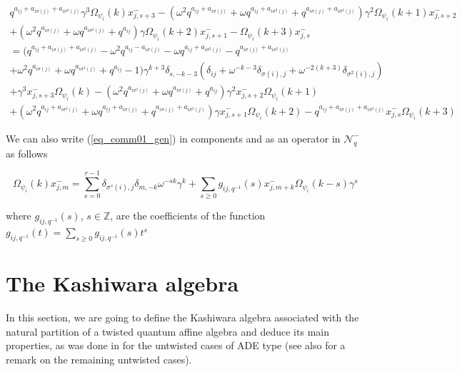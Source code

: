 \documentclass[12pt]{amsart}
\numberwithin{equation}{section}
\newcommand{\Z}{\ensuremath{\mathbb{Z}}}
\newcommand{\mc}[1]{\mathcal{#1}}
\begin{document}
\begin{multline}\label{Kas_commxO_r3}
    q^{a_{ij} + a_{i\sigma(j)} + a_{i\sigma^2(j)}}\gamma^3\Omega_{\psi_i}(k)x_{j,s+3}^- - (\omega^2q^{a_{ij} + a_{i\sigma(j)}} + \omega q^{a_{ij} + a_{i\sigma^2(j)}} + q^{a_{i\sigma(j)} + a_{i\sigma^2(j)}})\gamma^2\Omega_{\psi_i}(k+1)x_{j,s+2}^-\\
   + (\omega^2q^{a_{i\sigma(j)}} + \omega q^{a_{i\sigma^2(j)}} + q^{a_{ij}})\gamma\Omega_{\psi_i}(k+2)x_{j,s+1}^- - \Omega_{\psi_i}(k+3)x_{j,s}^-\\
   = \bigl(q^{a_{ij} + a_{i\sigma(j)} + a_{i\sigma^2(j)}} - \omega^2q^{a_{ij} - a_{i\sigma(j)}} - \omega q^{a_{ij} + a_{i\sigma^2(j)}} - q^{a_{i\sigma(j)} + a_{i\sigma^2(j)}}\\
   + \omega^2q^{a_{i\sigma(j)}} + \omega q^{a_{i\sigma^2(j)}} + q^{a_{ij}} - 1 \bigl)\gamma^{k+3}\delta_{s,-k-3}(\delta_{ij} + \omega^{-k-3}\delta_{\sigma(i),j} + \omega^{-2(k+3)}\delta_{\sigma^2(i),j})\\
   + \gamma^3 x_{j,s+3}^-\Omega_{\psi_i}(k) - (\omega^2q^{a_{i\sigma^2(j)}} + \omega q^{a_{i\sigma(j)}} + q^{a_{ij}})\gamma^2x_{j,s+2}^-\Omega_{\psi_i}(k+1)\\ 
    +  (\omega^2q^{a_{ij} + a_{i\sigma^2(j)}} + \omega q^{a_{ij} + a_{i\sigma(j)}} + q^{a_{i\sigma(j)} + a_{i\sigma^2(j)}})\gamma x_{j,s+1}^-\Omega_{\psi_i}(k+2) - q^{a_{ij} + a_{i\sigma(j)} + a_{i\sigma^2(j)}}x_{j,s}^-\Omega_{\psi_i}(k+3)
\end{multline}

We can also write (\ref{eq_comm01_gen}) in components and as an operator in $\mc{N}_q^-$ as follows

\begin{equation}\label{action_omega_on_x}
    \Omega_{\psi_i}(k)x_{j,m}^- = \sum_{s=0}^{r-1}\delta_{\sigma^s(i),j}\delta_{m,-k}\omega^{-sk}\gamma^k + \sum_{s\geq 0}g_{ij,q^{-1}}(s)x_{j,m+k}^-\Omega_{\psi_i}(k-s)\gamma^s
\end{equation}

where $g_{ij,q^{-1}}(s)$, $s\in \Z$, are the coefficients of the function $g_{ij,q^{-1}}(t) = \sum_{s\geq 0} g_{ij,q^{-1}}(s)t^s$

\section{The Kashiwara algebra}

In this section, we are going to define the Kashiwara algebra associated with the natural partition of a twisted quantum affine algebra and deduce its main properties, as was done in \cite{CFM01} for the untwisted cases of ADE type (see also \cite{AFM} for a remark on the remaining untwisted cases).
\end{document}
